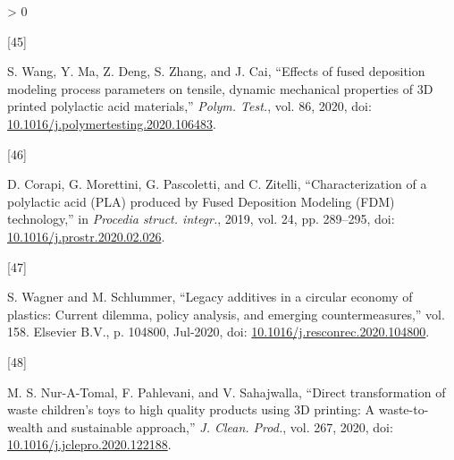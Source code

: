 \documentclass[conference,final,]{IEEEtran}
\newlength{\csllabelwidth}
\newlength{\cslhangindent}
\newenvironment{CSLReferences}[3] %
 {%
  \setlength{\parindent}{0pt}
  \ifodd #1 \everypar{\setlength{\hangindent}{\cslhangindent}}\ignorespaces\fi
  \ifnum #2 > 0
  \setlength{\parskip}{#2\baselineskip}
  \fi
 }%
 {}
\newcommand{\CSLLeftMargin}[1]{\parbox[t]{\csllabelwidth}{#1}}
\newcommand{\CSLRightInline}[1]{\parbox[t]{\linewidth - \csllabelwidth}{#1}}
\begin{document}
\begin{CSLReferences}{0}{0}
\leavevmode\hypertarget{ref-Wang2020h}{}%
\CSLLeftMargin{{[}45{]} }
\CSLRightInline{S. Wang, Y. Ma, Z. Deng, S. Zhang, and J. Cai,
{``{Effects of fused deposition modeling process parameters on tensile,
dynamic mechanical properties of 3D printed polylactic acid
materials},''} \emph{Polym. Test.}, vol. 86, 2020, doi:
\href{https://doi.org/10.1016/j.polymertesting.2020.106483}{10.1016/j.polymertesting.2020.106483}.}

\leavevmode\hypertarget{ref-Corapi2019}{}%
\CSLLeftMargin{{[}46{]} }
\CSLRightInline{D. Corapi, G. Morettini, G. Pascoletti, and C. Zitelli,
{``{Characterization of a polylactic acid (PLA) produced by Fused
Deposition Modeling (FDM) technology},''} in \emph{Procedia struct.
integr.}, 2019, vol. 24, pp. 289--295, doi:
\href{https://doi.org/10.1016/j.prostr.2020.02.026}{10.1016/j.prostr.2020.02.026}.}

\leavevmode\hypertarget{ref-Wagner2020}{}%
\CSLLeftMargin{{[}47{]} }
\CSLRightInline{S. Wagner and M. Schlummer, {``{Legacy additives in a
circular economy of plastics: Current dilemma, policy analysis, and
emerging countermeasures},''} vol. 158. Elsevier B.V., p. 104800,
Jul-2020, doi:
\href{https://doi.org/10.1016/j.resconrec.2020.104800}{10.1016/j.resconrec.2020.104800}.}

\leavevmode\hypertarget{ref-Nur-A-Tomal2020}{}%
\CSLLeftMargin{{[}48{]} }
\CSLRightInline{M. S. Nur-A-Tomal, F. Pahlevani, and V. Sahajwalla,
{``{Direct transformation of waste children's toys to high quality
products using 3D printing: A waste-to-wealth and sustainable
approach},''} \emph{J. Clean. Prod.}, vol. 267, 2020, doi:
\href{https://doi.org/10.1016/j.jclepro.2020.122188}{10.1016/j.jclepro.2020.122188}.}

\end{CSLReferences}
\end{document}
